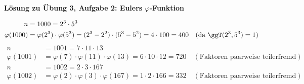 \textbf{Lösung zu Übung 3, Aufgabe 2: Eulers $\varphi$-Funktion}

\begin{loesung}
\begin{align*}
n &= 1000 = 2^3 \cdot 5^3\\
\varphi(1000) &= \varphi(2^3) \cdot \varphi(5^3) = (2^3 - 2^2) \cdot (5^3 - 5^2) = 4 \cdot 100 = 400 \quad (\text{da } \ggT(2^3, 5^3) = 1)
\end{align*}
\begin{align*}
n &= 1001 = 7 \cdot 11 \cdot 13\\
\varphi(1001) &= \varphi(7) \cdot \varphi(11) \cdot \varphi(13) = 6 \cdot 10 \cdot 12 = 720 \quad (\text{Faktoren paarweise teilerfremd})
\end{align*}
\begin{align*}
n &= 1002 = 2 \cdot 3 \cdot 167\\
\varphi(1002) &= \varphi(2) \cdot \varphi(3) \cdot \varphi(167) = 1 \cdot 2 \cdot 166 = 332 \quad (\text{Faktoren paarweise teilerfremd})
\end{align*}
\end{loesung}

